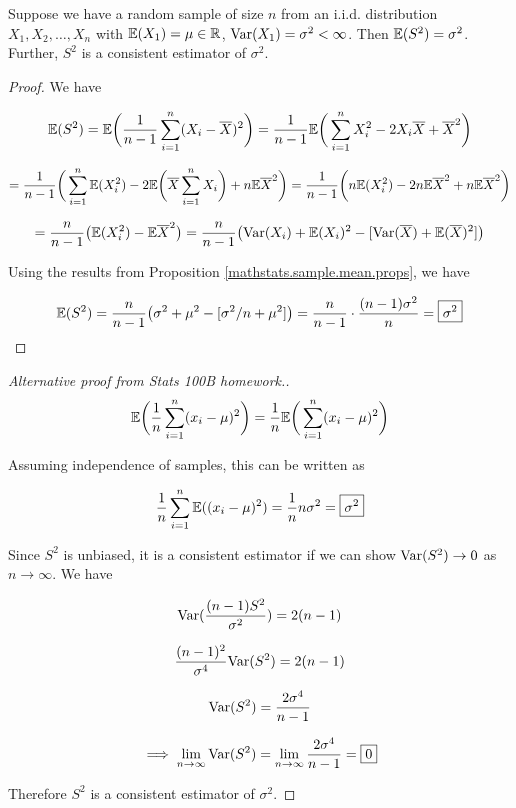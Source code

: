 \begin{proposition} Suppose we have a random sample of size \(n\) from an i.i.d. distribution \(X_1, X_2, \ldots, X_n\) with \(\E(X_1) = \mu \in \mathbb{R}\), \(\Var(X_1) = \sigma^2 < \infty\). Then \(\E(S^2) = \sigma^2\). Further, \(S^2\) is a consistent estimator of \(\sigma^2\).

\end{proposition}

\begin{proof}

We have

\[
\E(S^2) = \E \bigg( \frac{1}{n-1} \sum_{i=1}^n (X_i - \overline{X})^2 \bigg) = \frac{1}{n-1}  \E \bigg( \sum_{i=1}^n X_i^2 - 2X_i\overline{X} + \overline{X}^2 \bigg)
\]

\[
= \frac{1}{n-1} \bigg( \sum_{i=1}^n  \E(X_i^2)  - 2 \E \bigg( \overline{X}  \sum_{i=1}^n  X_i \bigg) + n \E\overline{X}^2 \bigg)  = \frac{1}{n-1} \bigg(  n \E(X_i^2)  - 2n \E  \overline{X}^2  + n \E\overline{X}^2 \bigg)
\]

\[
= \frac{n}{n-1} \big(   \E(X_i^2)  -  \E  \overline{X}^2 \big) = \frac{n}{n-1} \big(  \Var(X_i) + \E(X_i)^2 - [\Var(\overline{X}) + \E( \overline{X})^2] \big)
\]

Using the results from Proposition \ref{mathstats.sample.mean.props}, we have

\[
\E(S^2) = \frac{n}{n-1} \big(  \sigma^2 + \mu^2 - [ \sigma^2/n + \mu^2] \big)  = \frac{n}{n-1} \cdot \frac{(n-1) \sigma^2}{n}  = \boxed{\sigma^2}
\]

\end{proof}

\begin{proof}[Alternative proof from Stats 100B homework.]

\[
\E\bigg( \frac{1}{n} \sum_{i=1}^n(x_i - \mu)^2  \bigg) = \frac{1}{n}  \E\bigg( \sum_{i=1}^n(x_i - \mu)^2  \bigg)
\]

Assuming independence of samples, this can be written as

\[
\frac{1}{n}  \sum_{i=1}^n  \E( (x_i - \mu)^2) = \frac{1}{n} n \sigma^2 = \boxed{\sigma^2}
\]

Since \(S^2\) is unbiased, it is a consistent estimator if we can show \(\Var(S^2) \to 0\)  as \( n \to \infty\). We have

\[
\Var(\frac{(n-1)S^2}{\sigma^2}) = 2(n-1)
\]

\[
\frac{(n-1)^2}{\sigma^4}\Var(S^2) = 2(n-1)
\]

\[
\Var(S^2) = \frac{2\sigma^4}{n-1}
\]

\[
\implies \lim_{n \to \infty} \Var(S^2) =  \lim_{n \to \infty}  \frac{2\sigma^4}{n-1} = \boxed{0}
\]

Therefore \(S^2\) is a consistent estimator of \(\sigma^2\).

\end{proof}

